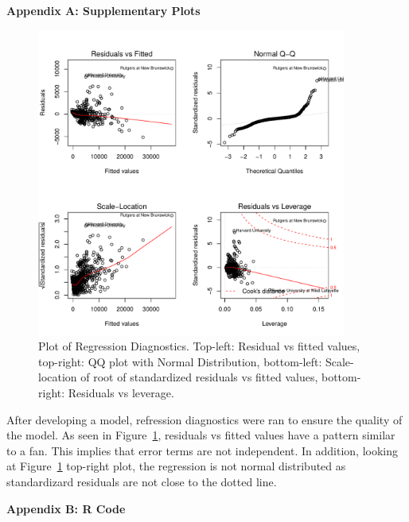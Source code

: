\documentclass{article}\usepackage[]{graphicx}\usepackage[]{color}
\newenvironment{knitrout}{}{} %
\begin{document}
\newpage
\noindent \Large{{\bf Appendix A: Supplementary Plots}}
\begin{figure}[h!]
\begin{center}
%
%

\begin{knitrout}
\color{fgcolor}
\includegraphics[width=4in]{figure/unnamed-chunk-3-1} 

\end{knitrout}

\caption{Plot of Regression Diagnostics. Top-left: Residual vs fitted values, top-right: QQ plot with Normal Distribution, bottom-left: Scale-location of root of standardized residuals vs fitted values, bottom-right: Residuals vs leverage.}
\label{reg_diag}
\end{center}
\end{figure}

\normalsize
After developing a model, refression diagnostics were ran to ensure the quality of the model. As seen in Figure~\ref{reg_diag}, residuals vs fitted values have a pattern similar to a fan. This implies that error terms are not independent. In addition, looking at Figure~\ref{reg_diag} top-right plot, the regression is not normal distributed as standardizard residuals are not close to the dotted line. 

\newpage
\noindent \Large{{\bf Appendix B: R Code}}

\end{document}
